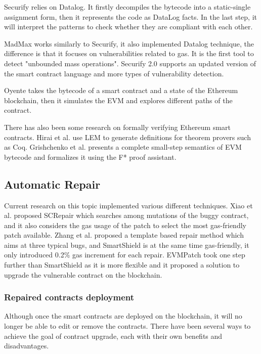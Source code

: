 \documentclass[sigplan,screen]{acmart}
\begin{document}
Securify\cite{tsankov2018securify} relies on Datalog. It firstly decompiles the bytecode into a static-single assignment form, then it represents the code as DataLog facts. In the last step, it will interpret the patterns to check whether they are compliant with each other.

MadMax\cite{grech2018madmax} works similarly to Securify, it also implemented Datalog technique, the difference is that it focuses on vulnerabilities related to gas. It is the first tool to detect "unbounded mass operations".
Securify 2.0 supports an updated version of the smart contract language and more types of vulnerability detection.

Oyente \cite{luu2016making} takes the bytecode of a smart contract and a state of the Ethereum blockchain, then it simulates the EVM and explores different paths of the contract.

There has also been some research on formally verifying Ethereum smart contracts. Hirai et al.\cite{hirai2017defining} use LEM to generate definitions for theorem provers such as Coq. Grishchenko et al.\cite{grishchenko2018semantic} presents a complete small-step semantics of EVM bytecode and formalizes it using the F* proof assistant.
\subsection{Automatic Repair}

Current research on this topic implemented various different techniques.
Xiao et al. \cite{yu2020smart} proposed SCRepair which searches among mutations of the buggy contract, and it also considers the gas usage of the patch to select the most gas-friendly patch available. Zhang et al. \cite{zhang2020smartshield} proposed a template based repair method which aims at three typical bugs, and SmartShield is at the same time gas-friendly, it only introduced 0.2\% gas increment for each repair. EVMPatch \cite{rodler2021evmpatch} took one step further than SmartShield as it is more flexible and it proposed a solution to upgrade the vulnerable contract on the blockchain.


\subsubsection{Repaired contracts deployment}

Although once the smart contracts are deployed on the blockchain, it will no longer be able to edit or remove the contracts. There have been several ways to achieve the goal of contract upgrade, each with their own benefits and disadvantages.
\end{document}
